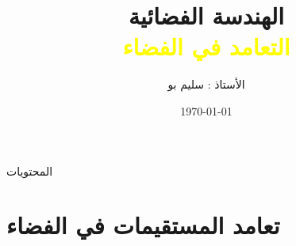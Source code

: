 \documentclass[dvipsnames,mathserif]{beamer}
\begin{document}
\rightskip\rightmargin

\title{الهندسة الفضائية \\
\textcolor{yellow}{التعامد في الفضاء}}

\author{الأستاذ : سليم بو}
\date{\today}

\begin{frame}
\maketitle
\end{frame}

\begin{frame}{المحتويات}
\tableofcontents
\end{frame}



\section{تعامد المستقيمات في الفضاء}
\end{document}
